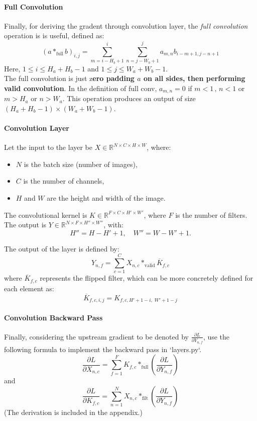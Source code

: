 \documentclass[lang=cn,11pt]{elegantbook}
\begin{document}
\paragraph*{Full Convolution} Finally, for deriving the gradent through convolution layer, the \textit{full convolution} operation is is useful, defined as:
\[
(a *_{\text{full}} b)_{i,j} =
\sum_{m=i-H_b+1}^{i} \sum_{n=j-W_b+1}^{j} a_{m,n} b_{i-m+1, j-n+1}
\]
Here, $1 \leq i \leq H_a + H_b - 1$ and $1 \leq j \leq W_a + W_b - 1$.\\
The full convolution is just z\textbf{ero padding $a$ on all sides, then performing valid convolution}.
In the definition of full conv, $a_{m,n} = 0$ if $m<1\,,\, n<1$ or $m>H_a$ or $n>W_a$.
This operation produces an output of size $(H_a + H_b  -1 )\times (W_a + W_b -1)$.

\paragraph*{Convolution Layer}
Let the input to the layer be $X \in \mathbb{R}^{N \times C \times H \times W}$, where:
\begin{itemize}
    \item $N$ is the batch size (number of images),
    \item $C$ is the number of channels,
    \item $H$ and $W$ are the height and width of the image.
\end{itemize}

The convolutional kernel is $K \in \mathbb{R}^{F \times C \times H' \times W'}$, where $F$ is the number of filters.\\

The output is $Y \in \mathbb{R}^{N \times F \times H'' \times W''}$, with:
\[
H'' = H - H' + 1, \quad W'' = W - W' + 1.
\]

The output of the layer is defined by:
\[
Y_{n,f} = \sum_{c=1}^{C} X_{n,c} *_{\text{valid}} \overline{K}_{f,c}
\]
where $\overline{K}_{f,c}$ represents the flipped filter, which can be more concretely defined for each element as:
\[\overline{K}_{f,c,i,j} = K_{f,c,H' + 1 - i,\; W' + 1 - j}
\]

\paragraph*{Convolution Backward Pass}
Finally, considering the upstream gradient to be denoted by $\frac{\partial L}{\partial Y_{n,f}}$, use the following formula to implement the backward pass in `layers.py`. \[
\frac{\partial L}{\partial X_{n,c}} = \sum_{f=1}^{F} K_{f,c} *_{\text{full}} \left( \frac{\partial L}{\partial Y_{n,f}} \right)
\]
and  \[
\frac{\partial L}{\partial K_{f,c}} = \sum_{n=1}^{N} X_{n,c} *_{\text{filt}} \left( \frac{\partial L}{\partial Y_{n,f}} \right)
\]
(The derivation is included in the appendix.)
\end{document}

